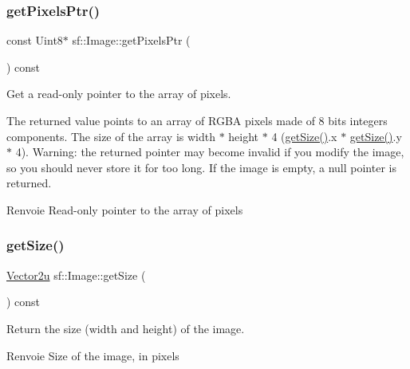 \subsubsection{\texorpdfstring{get\+Pixels\+Ptr()}{getPixelsPtr()}}
{\footnotesize\ttfamily const Uint8$\ast$ sf\+::\+Image\+::get\+Pixels\+Ptr (\begin{DoxyParamCaption}{ }\end{DoxyParamCaption}) const}



Get a read-\/only pointer to the array of pixels. 

The returned value points to an array of R\+G\+BA pixels made of 8 bits integers components. The size of the array is width $\ast$ height $\ast$ 4 (\hyperlink{classsf_1_1Image_a85409951b05369813069ed64393391ce}{get\+Size()}.x $\ast$ \hyperlink{classsf_1_1Image_a85409951b05369813069ed64393391ce}{get\+Size()}.y $\ast$ 4). Warning\+: the returned pointer may become invalid if you modify the image, so you should never store it for too long. If the image is empty, a null pointer is returned.

\begin{DoxyReturn}{Renvoie}
Read-\/only pointer to the array of pixels 
\end{DoxyReturn}
\mbox{\label{classsf_1_1Image_a85409951b05369813069ed64393391ce}} 
\subsubsection{\texorpdfstring{get\+Size()}{getSize()}}
{\footnotesize\ttfamily \hyperlink{classsf_1_1Vector2}{Vector2u} sf\+::\+Image\+::get\+Size (\begin{DoxyParamCaption}{ }\end{DoxyParamCaption}) const}



Return the size (width and height) of the image. 

\begin{DoxyReturn}{Renvoie}
Size of the image, in pixels 
\end{DoxyReturn}
\mbox{\label{classsf_1_1Image_a9e4f2aa8e36d0cabde5ed5a4ef80290b}} 

